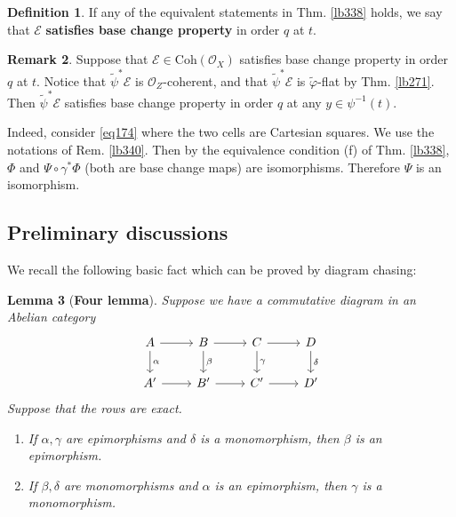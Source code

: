 \documentclass[12pt,b5paper,notitlepage]{report}
\theoremstyle{definition}
\newtheorem{df}{Definition}[section]
\newtheorem{rem}[df]{Remark}
\theoremstyle{plain}
\newtheorem{lm}[df]{Lemma}
\newcommand{\wtd}{\widetilde}
\newcommand{\scr}{\mathscr}
\newcommand{\Coh}{\mathrm{Coh}}
\numberwithin{equation}{section}
\begin{document}
\begin{df}
If any of the equivalent statements in Thm. \ref{lb338} holds, we say that $\scr E$ \textbf{satisfies base change property}  in order $q$ at $t$. 
\end{df}


\begin{rem}
Suppose that $\scr E\in\Coh(\scr O_X)$ satisfies base change property in order $q$ at $t$. Notice that $\wtd\psi^*\scr E$ is $\scr O_Z$-coherent, and that $\wtd\psi^*\scr E$ is $\wtd\varphi$-flat by Thm. \ref{lb271}. Then $\wtd\psi^*\scr E$ satisfies base change property in order $q$ at any $y\in\psi^{-1}(t)$.

Indeed, consider \eqref{eq174} where the two cells are Cartesian squares. We use the notations of Rem. \ref{lb340}. Then by the equivalence condition (f) of Thm. \ref{lb338}, $\Phi$ and $\Psi\circ\gamma^*\Phi$ (both are base change maps) are isomorphisms. Therefore $\Psi$ is an isomorphism.  \hfill\qedsymbol
\end{rem}








\subsection{Preliminary discussions}

We recall the following basic fact which can be proved by diagram chasing:

\begin{lm}[\textbf{Four lemma}]\label{lb349} 
Suppose we have a commutative diagram in an Abelian category
\begin{equation*}
\begin{tikzcd}
A \arrow[r] \arrow[d, "\alpha"] & B \arrow[r] \arrow[d, "\beta"] & C \arrow[r] \arrow[d, "\gamma"] & D \arrow[d, "\delta"] \\
A' \arrow[r]                    & B' \arrow[r]                   & C' \arrow[r]                    & D'                   
\end{tikzcd}
\end{equation*}
Suppose that the rows are exact. 
\begin{enumerate}[label=(\arabic*)]
\item If $\alpha,\gamma$ are epimorphisms and $\delta$ is a monomorphism, then $\beta$ is an epimorphism.
\item If $\beta,\delta$ are monomorphisms and $\alpha$ is an epimorphism, then $\gamma$ is a monomorphism.
\end{enumerate}
\end{lm}
\end{document}
